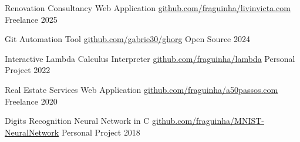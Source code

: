 




\begin{cvhonors}

\cvhonor
  {Renovation Consultancy Web Application}
  {\href{https://github.com/fraguinha/livinvicta.com}{github.com/fraguinha/livinvicta.com}}
  {Freelance}
  {2025}

\cvhonor
  {Git Automation Tool}
  {\href{https://github.com/gabrie30/ghorg}{github.com/gabrie30/ghorg}}
  {Open Source}
  {2024}

\cvhonor
  {Interactive Lambda Calculus Interpreter}
  {\href{https://github.com/fraguinha/lambda}{github.com/fraguinha/lambda}}
  {Personal Project}
  {2022}

\cvhonor
  {Real Estate Services Web Application}
  {\href{https://github.com/fraguinha/a50passos.com}{github.com/fraguinha/a50passos.com}}
  {Freelance}
  {2020}

\cvhonor
  {Digits Recognition Neural Network in C}
  {\href{https://github.com/fraguinha/MNIST-NeuralNetwork}{github.com/fraguinha/MNIST-NeuralNetwork}}
  {Personal Project}
  {2018}


\end{cvhonors}






